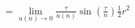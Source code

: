 \documentclass[preview]{standalone}
\begin{document}
\begin{align*}
= \lim_{u(n) \to 0} \frac {\tau} {u(n)} \sin \left( \frac {\tau} {n} \right) \frac {1} {2} r^2
\end{align*}
\end{document}

